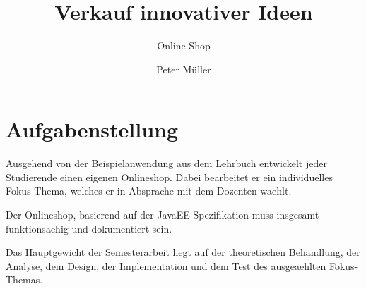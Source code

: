 \documentclass[a4paper,11pt] {article.cls}%
\author{Peter Müller}
\title{Verkauf innovativer Ideen} %
\subtitle{Online Shop} %
\begin{document}
    \section{Aufgabenstellung}\label{sec:aufgabenstellung}

    Ausgehend von der Beispielanwendung aus dem Lehrbuch entwickelt jeder Studierende einen
    eigenen Onlineshop. Dabei bearbeitet er ein individuelles Fokus-Thema, welches er in Absprache
    mit dem Dozenten waehlt.

    Der Onlineshop, basierend auf der JavaEE\cite{jee-spec} Spezifikation muss insgesamt funktionsaehig und dokumentiert sein.

    Das Hauptgewicht der Semesterarbeit liegt auf der theoretischen Behandlung, der Analyse, dem
    Design, der Implementation und dem Test des ausgeaehlten Fokus-Themas.


    \clearpage\appendix
    \renewcommand{\thesection}{A}
    
\end{document}
